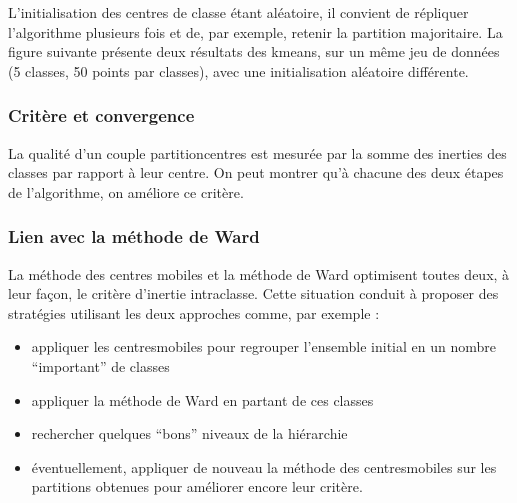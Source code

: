 \documentclass[letterpaper,10pt,english]{jupyterBook}
\begin{document}
\sphinxAtStartPar
{}

\sphinxAtStartPar
L’initialisation des centres de classe étant aléatoire, il convient de répliquer l’algorithme plusieurs fois et de, par exemple, retenir la partition majoritaire. La figure suivante présente deux résultats des k\sphinxhyphen{}means, sur un même jeu de données (5 classes, 50 points par classes), avec une initialisation aléatoire différente.

\sphinxAtStartPar
{}


\subsubsection{Critère et convergence}
\label{\detokenize{clustering:critere-et-convergence}}
\sphinxAtStartPar
La qualité d’un couple partition\sphinxhyphen{}centres est mesurée par la somme des inerties des classes par rapport à leur centre. On peut montrer qu’à chacune des deux étapes de l’algorithme, on améliore ce critère.


\subsubsection{Lien avec la méthode de Ward}
\label{\detokenize{clustering:lien-avec-la-methode-de-ward}}
\sphinxAtStartPar
La méthode des centres mobiles et la méthode de Ward optimisent toutes deux, à leur façon, le critère d’inertie intra\sphinxhyphen{}classe. Cette situation conduit à proposer des stratégies utilisant les deux approches comme, par exemple :
\begin{itemize}
\item {} 
\sphinxAtStartPar
appliquer les centres\sphinxhyphen{}mobiles pour regrouper l’ensemble initial en un nombre “important” de classes

\item {} 
\sphinxAtStartPar
appliquer la méthode de Ward en partant de ces classes

\item {} 
\sphinxAtStartPar
rechercher quelques “bons” niveaux de la hiérarchie

\item {} 
\sphinxAtStartPar
éventuellement, appliquer de nouveau la méthode des centres\sphinxhyphen{}mobiles sur les partitions obtenues pour améliorer encore leur critère.

\end{itemize}
\end{document}
